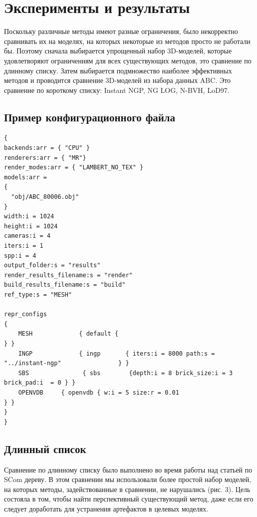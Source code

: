 \documentclass[a4paper,hidelinks,12pt]{article}
\begin{document}
\newpage

\section{Эксперименты и результаты}

Поскольку различные методы имеют разные ограничения, было некорректно сравнивать их на моделях, 
на которых некоторые из методов просто не работали бы. Поэтому сначала выбирается упрощенный набор 
3D-моделей, которые удовлетворяют ограничениям для всех существующих методов, это сравнение по 
длинному списку. Затем выбирается подмножество наиболее эффективных методов и проводится сравнение 3D-моделей из 
набора данных ABC. Это сравнение по короткому списку: Instant NGP, NG LOG, N-BVH, LoD97.

\subsection{Пример конфигурационного файла}

\begin{verbatim}
{
backends:arr = { "CPU" }
renderers:arr = { "MR"}
render_modes:arr = { "LAMBERT_NO_TEX" }
models:arr = 
{ 
  "obj/ABC_80006.obj"
}
width:i = 1024
height:i = 1024
cameras:i = 4
iters:i = 1
spp:i = 4
output_folder:s = "results"
render_results_filename:s = "render"
build_results_filename:s = "build"
ref_type:s = "MESH"

repr_configs
{
	MESH 			 { default { 																																													} }
	INGP 			 { ingp 	  { iters:i = 8000 path:s = "../instant-ngp" 				} }
	SBS 			  { sbs 	   {depth:i = 8 brick_size:i = 3 brick_pad:i  = 0 } }
	OPENVDB		{ openvdb { w:i = 5 size:r = 0.01 																							} }
}
}

\end{verbatim}

\subsection{Длинный список}

Сравнение по длинному списку было выполнено во время работы над статьей по SCom дереву. В этом сравнении мы использовали более простой набор 
моделей, на которых методы, задействованные в сравнении, не нарушались (рис. 3). Цель состояла в том, чтобы найти перспективный существующий метод, 
даже если его следует доработать для устранения артефактов в целевых моделях.
\end{document}
